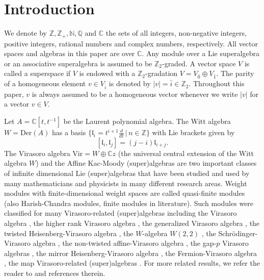 \documentclass[1p]{elsarticle}
\numberwithin{equation}{section}
\def\bC{\mathbb{C}}
\def\bN{\mathbb{N}}
\def\bZ{\mathbb{Z}}
\def\bQ{\mathbb{Q}}
\def\Der{\mathrm{Der}}
\def\Vir{\mathrm{Vir}}
\def\fl{\mathfrak{l}}
\begin{document}

\section{Introduction}
We denote by $\bZ, \bZ_+, \bN, \bQ$ and $\bC$ the sets of all integers, non-negative integers, positive integers, rational numbers and complex numbers, respectively. All vector spaces and algebras in this paper are over $\bC$. Any module over a Lie superalgebra or an associative superalgebra is assumed to be $\bZ_2$-graded. A vector space $V$ is called a superspace if $V$ is endowed with a $\bZ_2$-gradation $V=V_{\bar 0}\oplus V_{\bar 1}$. The parity of a homogeneous element $v\in V_{\bar{i}}$ is denoted by $|v|=\bar{i}\in \bZ_2$.  Throughout this paper, $v$ is always assumed to be a homogeneous vector whenever we write $|v|$ for a vector $v\in V$.

Let $A=\bC[t,t^{-1}]$ be the Laurent polynomial algebra. The Witt algebra $W=\Der(A)$ has a basis $\{\fl_i=t^{i+1}\frac{d}{dt}\,|\, n\in \mathbb{Z}\}$ with Lie brackets given by
$$[\fl_i, \fl_j]=(j-i)\fl_{i+j}.$$  The Virasoro algebra  $\Vir=W\oplus   \bC z$ (the universal central extension of the Witt algebra $W$) and the Affine Kac-Moody (super)algebras are two important classes of infinite dimensional Lie (super)algebras that have been studied and used by many mathematicians and physicists in many  different research areas. Weight modules with finite-dimensional weight spaces are called quasi-finite modules (also Harish-Chandra modules, finite modules in literature). Such modules were classified for many Virasoro-related (super)algebras including the Virasoro algebra \cite{Ma}, the higher rank Virasoro algebra \cite{LZ,S2}, the generalized Virasoro algebra \cite{GLZ1}, the twisted Heisenberg-Virasoro algebra \cite{LZ2}, the $W$-algebra $W(2,2)$ \cite{LGZ}, the Schr\"{o}dinger-Virasoro algebra \cite{L}, the non-twisted affine-Virasoro algebra \cite{ GHL,LPX,Rao2}, the gap-$p$ Virasoro algebras \cite{X}, the mirror Heisenberg-Virasoro algebra \cite{LPXZ}, the Fermion-Virasoro algebra \cite{XZ}, the map Virasoro-related (super)algebras \cite{CLW,GLZ2,Rao}. For more related results, we refer the reader to \cite{A,B,CP,Rao,Rao1,GG,HLW,IK,LiuZ,NY,OR} and references therein.
\end{document}
